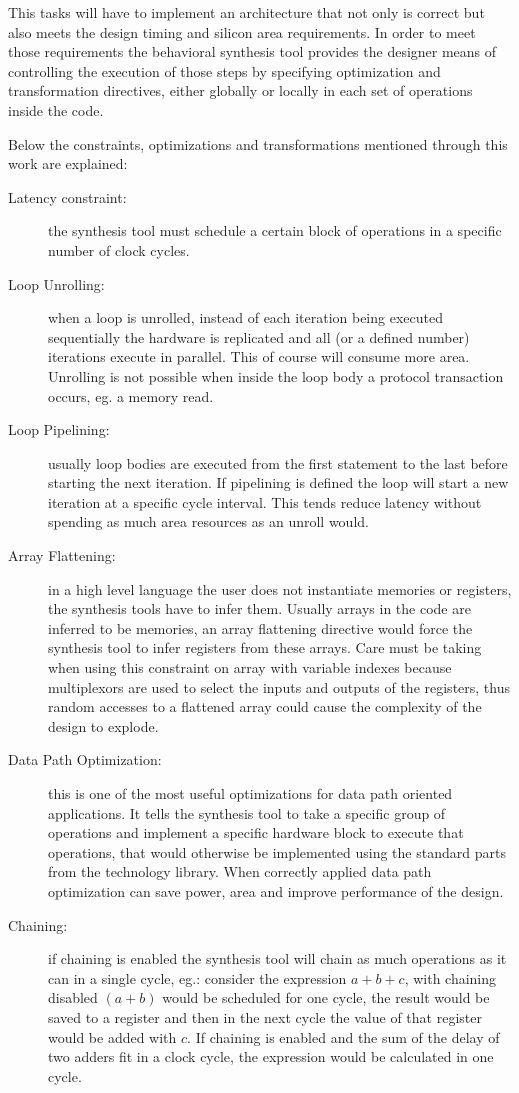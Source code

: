 \documentclass[a4paper, 12pt]{article}
\begin{document}
	This tasks will have to implement an architecture that not only is correct but also meets the design timing and silicon area requirements. In order to meet those requirements the behavioral synthesis tool provides the designer means of controlling the execution of those steps by specifying optimization and transformation directives, either globally or locally in each set of operations inside the code. 
	
	Below the constraints, optimizations and transformations mentioned through this work are explained:
\begin{description}
\item[Latency constraint:] the synthesis tool must schedule a certain block of operations in a specific number of clock cycles.
\item[Loop Unrolling:] when a loop is unrolled, instead of each iteration being executed sequentially the hardware is replicated and all (or a defined number) iterations execute in parallel. This of course will consume more area. Unrolling is not possible when inside the loop body a protocol transaction occurs, eg. a memory read.
\item[Loop Pipelining:] usually loop bodies are executed from the first statement to the last before starting the next iteration. If pipelining is defined the loop will start a new iteration at a specific cycle interval. This tends reduce latency without spending as much area resources as an unroll would.
\item[Array Flattening:] in a high level language the user does not instantiate memories or registers, the synthesis tools have to infer them. Usually arrays in the code are inferred to be memories, an array flattening directive would force the synthesis tool to infer registers from these arrays. Care must be taking when using this constraint on array with variable indexes because multiplexors are used to select the inputs and outputs of the registers, thus random accesses to a flattened array could cause the complexity of the design to explode.
\item[Data Path Optimization:] this is one of the most useful optimizations for data path oriented applications. It tells the synthesis tool to take a specific group of operations and implement a specific hardware block to execute that operations, that would otherwise be implemented using the standard parts from the technology library. When correctly applied data path optimization can save power, area and improve performance of the design.
\item[Chaining:] if chaining is enabled the synthesis tool will chain as much operations as it can in a single cycle, eg.: consider the expression $a + b + c$, with chaining disabled $(a+b)$ would be scheduled for one cycle, the result would be saved to a register and then in the next cycle the value of that register would be added with $c$. If chaining is enabled and the sum of the delay of two adders fit in a clock cycle, the expression would be calculated in one cycle.

\end{description}
\end{document}
